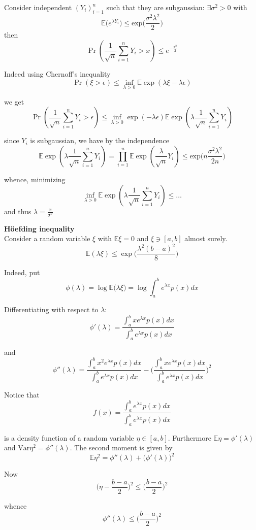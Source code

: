 \documentclass[a4paper]{article}
\newcommand{\clo}[1]{{\left [ #1 \right ]}}
\newcommand{\brac}[1]{{\left ( #1 \right )}}
\newcommand{\Ex}{\mathbb{E}}
\newcommand{\Var}{\text{Var}}
\begin{document}
Consider independent $\brac{Y_i}_{i=1}^n$ such that they are subgaussian: $\exists \sigma^2 > 0$ with \[\Ex\big( e^{\lambda Y_i} \big) \leq \text{exp}\big( \frac{\sigma^2 \lambda^2}{2} \big)\]
then 
\[\Pr\brac{ \frac{1}{\sqrt{n}}\sum_{i=1}^n Y_i > x }\leq e^{-\frac{x^2}{2}}\]

Indeed using Chernoff's inequality
\[\Pr\brac{\xi>\epsilon}\leq \inf_{\lambda>0} \Ex\exp\brac{\lambda\xi - \lambda\epsilon}\]

we get
\[\Pr\brac{\frac{1}{\sqrt{n}}\sum_{i=1}^n Y_i>\epsilon}\leq \inf_{\lambda>0} \exp\brac{ - \lambda\epsilon} \Ex\exp\brac{\lambda\frac{1}{\sqrt{n}}\sum_{i=1}^n Y_i}\]

since $Y_i$ is subgaussian, we have by the independence
\[\Ex\exp\brac{\lambda\frac{1}{\sqrt{n}}\sum_{i=1}^n Y_i} = 
\prod_{i=1}^n \Ex\exp\brac{\frac{\lambda}{\sqrt{n}} Y_i} \leq 
\text{exp}\big( n \frac{\sigma^2 \lambda^2}{2n} \big)
\]

whence, minimizing
\[\inf_{\lambda>0} \Ex\exp\brac{\lambda\frac{1}{\sqrt{n}}\sum_{i=1}^n Y_i} \leq \ldots\]
and thus $\lambda = \frac{x}{\sigma^2}$

\noindent\textbf{H\"oefding inequality}\hfill\\
Consider a random variable $\xi$ with $\Ex \xi = 0$ and $\xi\ni\clo{a,b}$ almost surely.
\[\Ex\brac{\lambda \xi}\leq \exp\big( \frac{\lambda^2(b-a)^2}{8} \big)\]

Indeed, put
\[\phi(\lambda) = \log \Ex\big(\lambda \xi\big) = \log \int_a^b e^{\lambda x} p(x) dx\]

Differentiating with respect to $\lambda$:
\[\phi'(\lambda) = \frac{\int_a^b x e^{\lambda x} p(x) dx}{\int_a^b e^{\lambda x} p(x) dx}\]

and 
\[\phi''(\lambda) = \frac{\int_a^b x^2 e^{\lambda x} p(x) dx}{\int_a^b e^{\lambda x} p(x) dx} - \bigg( \frac{\int_a^b x e^{\lambda x} p(x) dx}{\int_a^b e^{\lambda x} p(x) dx} \bigg)^2\]

Notice that
\[f(x) = \frac{\int_a^b e^{\lambda x} p(x) dx}{\int_a^b e^{\lambda x} p(x) dx}\]

is a density function of a random variable $\eta\in \clo{a,b}$. Furthermore $\Ex \eta = \phi'(\lambda)$ and $\Var \eta^2 = \phi''(\lambda)$. The second moment is given by
\[\Ex \eta^2 = \phi''(\lambda) + \big(\phi'(\lambda)\big)^2\]

Now
\[\bigg(\eta - \frac{b-a}{2}\bigg)^2 \leq \bigg(\frac{b-a}{2}\bigg)^2\]

whence 
\[\phi''(\lambda) \leq \bigg(\frac{b-a}{2}\bigg)^2 \]
\end{document}
